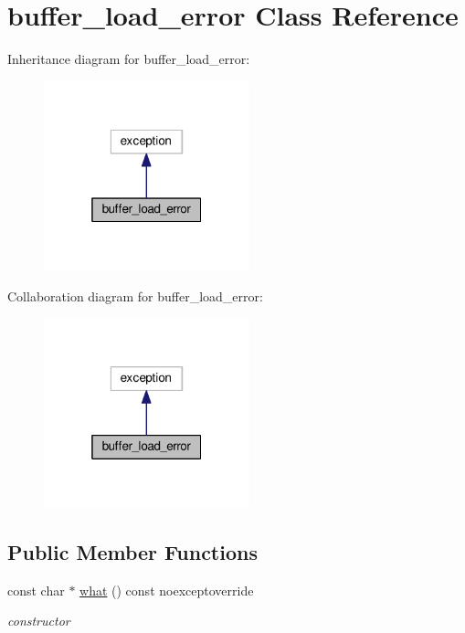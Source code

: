 \hypertarget{classbuffer__load__error}{}\section{buffer\+\_\+load\+\_\+error Class Reference}
\label{classbuffer__load__error}


Inheritance diagram for buffer\+\_\+load\+\_\+error\+:
\nopagebreak
\begin{figure}[H]
\begin{center}
\leavevmode
\includegraphics[width=169pt]{classbuffer__load__error__inherit__graph}
\end{center}
\end{figure}


Collaboration diagram for buffer\+\_\+load\+\_\+error\+:
\nopagebreak
\begin{figure}[H]
\begin{center}
\leavevmode
\includegraphics[width=169pt]{classbuffer__load__error__coll__graph}
\end{center}
\end{figure}
\subsection*{Public Member Functions}
\begin{DoxyCompactItemize}
\item 
const char $\ast$ \hyperlink{classbuffer__load__error_a510433cfaaf0ffb25cb1bdc6e73f1e37}{what} () const noexceptoverride
\begin{DoxyCompactList}\small\item\em constructor \end{DoxyCompactList}\end{DoxyCompactItemize}


